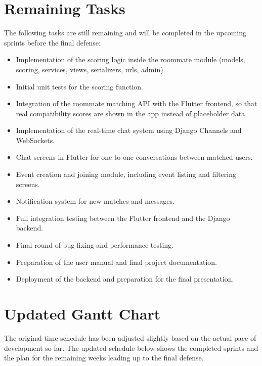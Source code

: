 \section{Remaining Tasks}
The following tasks are still remaining and will be completed in the upcoming sprints before the final defense:
\begin{itemize}
\item Implementation of the scoring logic inside the roommate module (models, scoring, services, views, serializers, urls, admin).
\item Initial unit tests for the scoring function.
\item Integration of the roommate matching API with the Flutter frontend, so that real compatibility scores are shown in the app instead of placeholder data.

\item Implementation of the real-time chat system using Django Channels and WebSockets.
\item Chat screens in Flutter for one-to-one conversations between matched users.
\item Event creation and joining module, including event listing and filtering screens.
\item Notification system for new matches and messages.

\item Full integration testing between the Flutter frontend and the Django backend.
\item Final round of bug fixing and performance testing.
\item Preparation of the user manual and final project documentation.
\item Deployment of the backend and preparation for the final presentation.
\end{itemize}

\section{Updated Gantt Chart}
The original time schedule has been adjusted slightly based on the actual pace of development so far. The updated schedule below shows the completed sprints and the plan for the remaining weeks leading up to the final defense.


